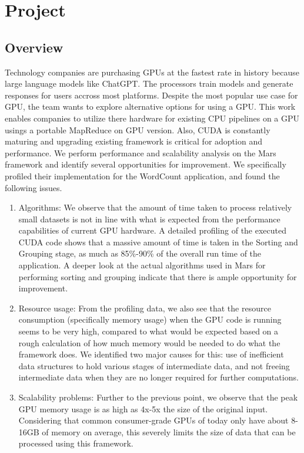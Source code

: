 \documentclass{article}
\begin{document}
\section{Project}
\subsection{Overview}
Technology companies are purchasing GPUs at the fastest rate in history because large language models like ChatGPT. The processors train models and generate responses for users accross most platforms. Despite the most popular use case for GPU, the team wants to explore alternative options for using a GPU. This work enables companies to utilize there hardware for existing CPU pipelines on a GPU usings a portable MapReduce on GPU version. Also, CUDA \cite{cuda_docs} is constantly maturing and upgrading existing framework is critical for adoption and performance. We perform performance and scalability analysis on the Mars framework and identify several opportunities for improvement. We specifically profiled their implementation for the WordCount application, and found the following issues. 

\begin{enumerate}
    \item Algorithms: We observe that the amount of time taken to process relatively small datasets is not in line with what is expected from the performance capabilities of current GPU hardware. A detailed profiling of the executed CUDA code shows that a massive amount of time is taken in the Sorting and Grouping stage, as much as 85\%-90\% of the overall run time of the application. A deeper look at the actual algorithms used in Mars for performing sorting and grouping indicate that there is ample opportunity for improvement.
    \item Resource usage: From the profiling data, we also see that the resource consumption (specifically memory usage) when the GPU code is running seems to be very high, compared to what would be expected based on a rough calculation of how much memory would be needed to do what the framework does. We identified two major causes for this: use of inefficient data structures to hold various stages of intermediate data, and not freeing intermediate data when they are no longer required for further computations. 
    \item Scalability problems: Further to the previous point, we observe that the peak GPU memory usage is as high as 4x-5x the size of the original input. Considering that common consumer-grade GPUs of today only have about 8-16GB of memory on average, this severely limits the size of data that can be processed using this framework. 
\end{enumerate}
\end{document}
